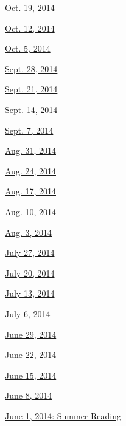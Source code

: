 \href{http://www.nytimes.com/indexes/2014/10/19/books/review/index.html}{Oct.
19, 2014}

\href{http://www.nytimes.com/indexes/2014/10/12/books/review/index.html}{Oct.
12, 2014}

\href{http://www.nytimes.com/indexes/2014/10/05/books/review/index.html}{Oct.
5, 2014}

\href{http://www.nytimes.com/indexes/2014/09/28/books/review/index.html}{Sept.
28, 2014}

\href{http://www.nytimes.com/indexes/2014/09/21/books/review/index.html}{Sept.
21, 2014}

\href{http://www.nytimes.com/indexes/2014/09/14/books/review/index.html}{Sept.
14, 2014}

\href{http://www.nytimes.com/indexes/2014/09/07/books/review/index.html}{Sept.
7, 2014}

\href{http://www.nytimes.com/indexes/2014/08/31/books/review/index.html}{Aug.
31, 2014}

\href{http://www.nytimes.com/indexes/2014/08/24/books/review/index.html}{Aug.
24, 2014}

\href{http://www.nytimes.com/indexes/2014/08/17/books/review/index.html}{Aug.
17, 2014}

\href{http://www.nytimes.com/indexes/2014/08/10/books/review/index.html}{Aug.
10, 2014}

\href{http://www.nytimes.com/indexes/2014/08/03/books/review/index.html}{Aug.
3, 2014}

\href{http://www.nytimes.com/indexes/2014/07/27/books/review/index.html}{July
27, 2014}

\href{http://www.nytimes.com/indexes/2014/07/20/books/review/index.html}{July
20, 2014}

\href{http://www.nytimes.com/indexes/2014/07/13/books/review/index.html}{July
13, 2014}

\href{http://www.nytimes.com/indexes/2014/07/06/books/review/index.html}{July
6, 2014}

\href{http://www.nytimes.com/indexes/2014/06/29/books/review/index.html}{June
29, 2014}

\href{http://www.nytimes.com/indexes/2014/06/22/books/review/index.html}{June
22, 2014}

\href{http://www.nytimes.com/indexes/2014/06/15/books/review/index.html}{June
15, 2014}

\href{http://www.nytimes.com/indexes/2014/06/08/books/review/index.html}{June
8, 2014}

\href{http://www.nytimes.com/indexes/2014/06/01/books/review/index.html}{June
1, 2014: Summer Reading}

